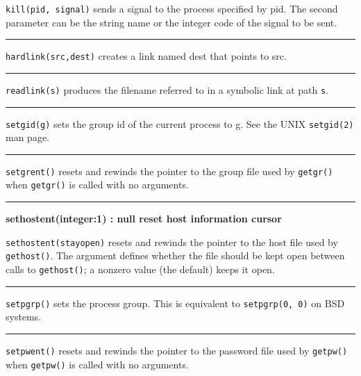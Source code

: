\noindent
\texttt{kill(pid, signal)} sends a signal to the process specified by pid. The
second parameter can be the string name or the integer code of the
signal to be sent.

\bigskip\hrule\vspace{0.1cm}

\noindent
{}\texttt{hardlink(src,dest)} creates a link
named dest that points to src.

\bigskip\hrule\vspace{0.1cm}

\noindent
\texttt{readlink(s)} produces the filename referred to in a symbolic link
at path \texttt{s}.

\bigskip\hrule\vspace{0.1cm}

\noindent
\texttt{setgid(g)} sets the group id of the current process to g. See the UNIX
\texttt{setgid(2)} man page.

\bigskip\hrule\vspace{0.1cm}

\noindent
\texttt{setgrent()} resets and rewinds the pointer to the group file used by
\texttt{getgr()} when \texttt{getgr()} is called with no arguments.

\bigskip\hrule\vspace{0.1cm}
\noindent
{\bf sethostent(integer:1) : null \hfill reset host information cursor}

\noindent
\texttt{sethostent(stayopen)} resets and rewinds the pointer to the host file
used by \texttt{gethost()}. The argument defines whether the file should be kept
open between calls to \texttt{gethost()}; a nonzero value (the default) keeps it
open.

\bigskip\hrule\vspace{0.1cm}

\noindent
\texttt{setpgrp()} sets the process group. This is equivalent to
\texttt{setpgrp(0, 0)} on BSD systems.

\bigskip\hrule\vspace{0.1cm}

\noindent
\texttt{setpwent()} resets and rewinds the pointer to the password file used by
\texttt{getpw()} when \texttt{getpw()} is called with no arguments.

